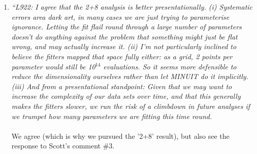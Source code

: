 \begin{enumerate}
\vspace{5 mm}
\item
{\em
	``L922:
I agree that the 2+8 analysis is better presentationally. (i) Systematic errors area dark art, in many cases we are just trying to parameterise ignorance. Letting the fit flail round through a large number of parameters doesn't do anything against the problem that something might just be flat wrong, and may actually increase it. (ii) I'm not particularly inclined to believe the fitters mapped that space fully either: as a grid, 2 points per parameter would still be 10$^{14}$ evaluations. So it seems more defensible to reduce the dimensionality ourselves rather than let MINUIT do it implicitly. (iii) And from a presentational standpoint: Given that we may want to increase the complexity of our data sets over time, and that this generally makes the fitters slower, we run the risk of a climbdown in future analyses if we trumpet how many parameters we are fitting this time round.
}\\
\\
We agree (which is why we pursued the '2+8' result), but also see the response to Scott's comment \#3.

\end{enumerate}
